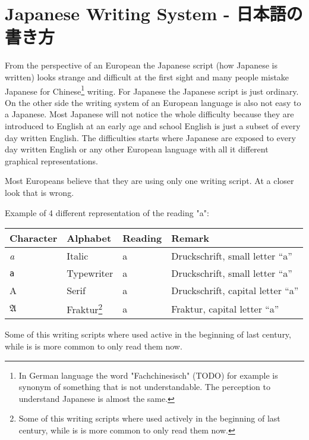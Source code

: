 \chapter{Japanese Writing System - 日本語の書き方}\label{chap:JapaneseWritingSystem}

From the perspective of an European the Japanese script (how Japanese is
written) looks strange and difficult at the first sight and many people mistake
Japanese for Chinese\footnote{In German language the word "Fachchinesisch"
(TODO) for example is synonym of something that is not understandable. The
perception to understand Japanese is almost the same.} writing.  For Japanese
the Japanese script is just ordinary. On the other side the writing system of
an European language is also not easy to a Japanese. Most Japanese will not
notice the whole difficulty because they are introduced to English at an early
age and school English is just a subset of every day written English. The
difficulties starts where Japanese are exposed to every day written English or
any other European language with all it different graphical representations.

Most Europeans believe that they are using only one writing script. At a closer
look that is wrong.

\bigskip Example of 4 different representation of the reading "a":

\begin{center}
\begin{tabular}{|l|l|l|l|}
\textbf{Character}&\textbf{Alphabet}&\textbf{Reading}&\textbf{Remark}\\\hline
\textit{a}     &  Italic        & a & Druckschrift, small letter ``a'' \\ 
\texttt{a}     &  Typewriter    & a & Druckschrift, small letter ``a'' \\ 
A              &  Serif         & a & Druckschrift, capital letter ``a'' \\ 
$\mathfrak{A}$ & Fraktur\footnote{Some of this writing scripts where used 
actively in the beginning of last century, while is is more common to only 
read them now.}& a & Fraktur, capital letter ``a''  \\ 
\end{tabular}
\end{center}

Some of this writing scripts where used active in the beginning of last
century, while is is more common to only read them now. 

